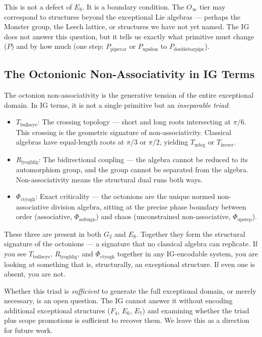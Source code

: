 \documentclass[12pt,a4paper]{article}
\begin{document}
This is not a defect of $E_8$. It is a boundary condition. The $O_{\infty}$ tier may correspond to structures beyond the exceptional Lie algebras --- perhaps the Monster group, the Leech lattice, or structures we have not yet named. The IG does not answer this question, but it tells us exactly what primitive must change ($P$) and by how much (one step: $P_{\text{pipevar}}$ or $P_{\text{upsilon}}$ to $P_{\text{doublebarpipe}}$).

\subsection{The Octonionic Non-Associativity in IG Terms}

The octonion non-associativity is the generative tension of the entire exceptional domain. In IG terms, it is not a single primitive but an \emph{inseparable triad}:

\begin{itemize}
    \item \textbf{$T_{\text{bullseye}}$}: The crossing topology --- short and long roots intersecting at $\pi/6$. This crossing is the geometric signature of non-associativity. Classical algebras have equal-length roots at $\pi/3$ or $\pi/2$, yielding $T_{\text{nrleg}}$ or $T_{\text{invscr}}$.
    \item \textbf{$R_{\text{lyoghlig}}$}: The bidirectional coupling --- the algebra cannot be reduced to its automorphism group, and the group cannot be separated from the algebra. Non-associativity means the structural dual runs both ways.
    \item \textbf{$\Phi_{\text{ctyogh}}$}: Exact criticality --- the octonions are the unique normed non-associative division algebra, sitting at the precise phase boundary between order (associative, $\Phi_{\text{softsign}}$) and chaos (unconstrained non-associative, $\Phi_{\text{upstep}}$).
\end{itemize}

These three are present in both $G_2$ and $E_8$. Together they form the structural signature of the octonions --- a signature that no classical algebra can replicate. If you see $T_{\text{bullseye}}$, $R_{\text{lyoghlig}}$, and $\Phi_{\text{ctyogh}}$ together in any IG-encodable system, you are looking at something that is, structurally, an exceptional structure. If even one is absent, you are not.

Whether this triad is \emph{sufficient} to generate the full exceptional domain, or merely necessary, is an open question. The IG cannot answer it without encoding additional exceptional structures ($F_4$, $E_6$, $E_7$) and examining whether the triad plus scope promotions is sufficient to recover them. We leave this as a direction for future work.
\end{document}
